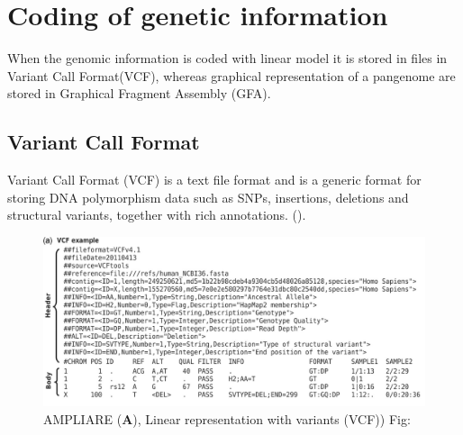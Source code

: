 \section{Coding of genetic information}

When the genomic information is coded with linear model it is stored in files in Variant Call Format(VCF), whereas graphical representation of a pangenome are stored in Graphical Fragment Assembly (GFA). 



\subsection{Variant Call Format}
Variant Call Format (VCF) is a text file format and is a generic format for storing DNA polymorphism data such as SNPs, insertions, deletions and structural variants, together with rich annotations. (\cite{10.1093/bioinformatics/btr330}). 


\begin{figure}[H]
\centering
\includegraphics[width=1.00\textwidth]{fig/vcf.png}
\decoRule
\caption{AMPLIARE (\textbf{A}), Linear representation with variants (VCF)) Fig:\cite{10.1093/bioinformatics/btr330}}
\label{fig:vcf.png}
\end{figure}



